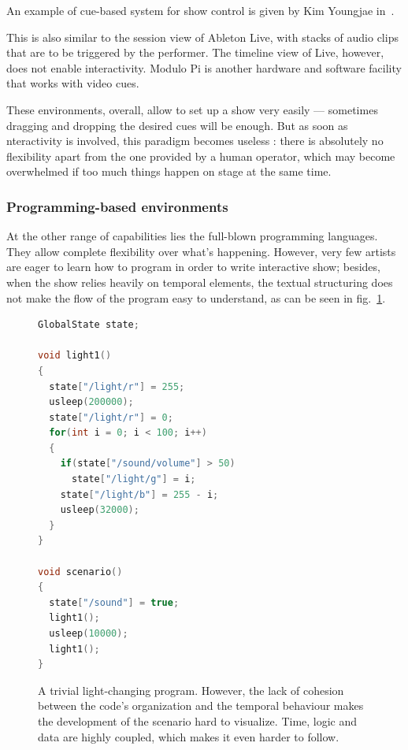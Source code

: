 \documentclass{sigchi}
\begin{document}
An example of cue-based system for show control is given by Kim Youngjae in~\cite{kim_unified_2013}. 

This is also similar to the session view of Ableton Live, with stacks of audio clips that are to be triggered by the performer. The timeline view of Live, however, does not enable interactivity. Modulo Pi is another hardware and software facility that works with video cues.

These environments, overall, allow to set up a show very easily --- sometimes dragging and dropping the desired cues will be enough. But as soon as nteractivity is involved, this paradigm becomes useless : there is absolutely no flexibility apart from the one provided by a human operator, which may become overwhelmed if too much things happen on stage at the same time.

\subsubsection{Programming-based environments}
At the other range of capabilities lies the full-blown programming languages. They allow complete flexibility over what's happening. However, very few artists are eager to learn how to program in order to write interactive show; besides, when the show relies heavily on temporal elements, the textual structuring does not make the flow of the program easy to understand, as can be seen in fig.~\ref{fig.hardtofollow}.

\begin{figure}[h]
\begin{lstlisting}[language=c++]
GlobalState state;

void light1()
{
  state["/light/r"] = 255;
  usleep(200000);    
  state["/light/r"] = 0;
  for(int i = 0; i < 100; i++)
  {
    if(state["/sound/volume"] > 50)
      state["/light/g"] = i;        
    state["/light/b"] = 255 - i;
    usleep(32000);
  }
}

void scenario()
{
  state["/sound"] = true;
  light1();
  usleep(10000);
  light1();
}
\end{lstlisting}
\caption{A trivial light-changing program. However, the lack of cohesion between the code's organization and the temporal behaviour makes the development of the scenario hard to visualize. Time, logic and data are highly coupled, which makes it even harder to follow.}
\label{fig.hardtofollow}
\end{figure}
\end{document}
